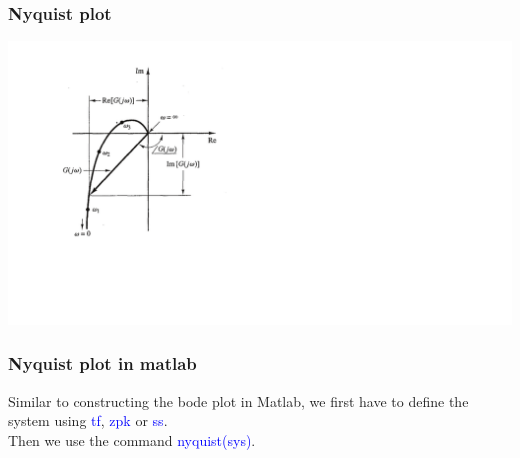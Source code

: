 \begin{frame}
\frametitle{Nyquist plot}


\includegraphics[scale=0.5]{NyquistPlot}



\end{frame}

\begin{frame}
\frametitle{Nyquist plot in matlab}
Similar to constructing the bode plot in Matlab, we first have to define the system using \textcolor{blue}{tf}, \textcolor{blue}{zpk} or \textcolor{blue}{ss}.\\
Then we use the command \textcolor{blue}{nyquist(sys)}.


\end{frame}

